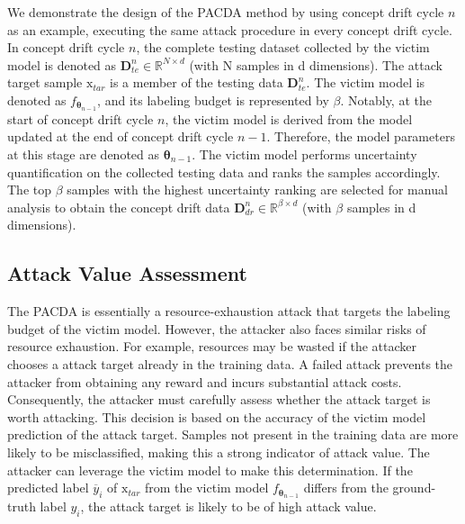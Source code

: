 \documentclass[conference,compsoc]{IEEEtran} %
\begin{document}
We demonstrate the design of the PACDA method by using concept drift cycle $n$ as an example, executing the same attack procedure in every concept drift cycle.
In concept drift cycle $n$, the complete testing dataset collected by the victim model is denoted as $\bm{D}_{te}^{n} \in \mathbb{R}^{N \times d}$ (with N samples in d dimensions).
The attack target sample $\bm{\mathrm{x}}_{tar}$ is a member of the testing data $\bm{D}_{te}^{n}$. 
The victim model is denoted as $f_{\bm{\theta}_{n-1}}$, and its labeling budget is represented by $\beta$.
Notably, at the start of concept drift cycle $n$, the victim model is derived from the model updated at the end of concept drift cycle $n-1$. Therefore, the model parameters at this stage are denoted as $\bm{\theta}_{n-1}$.
The victim model performs uncertainty quantification on the collected testing data and ranks the samples accordingly.
The top $\beta$ samples with the highest uncertainty ranking are selected for manual analysis to obtain the concept drift data $\bm{D}_{dr}^{n} \in \mathbb{R}^{\beta \times d}$ (with $\beta$ samples in d dimensions).

\subsection{Attack Value Assessment}
\label{Sec: Attack Value Assessment}
The PACDA is essentially a resource-exhaustion attack that targets the labeling budget of the victim model.
However, the attacker also faces similar risks of resource exhaustion.
For example, resources may be wasted if the attacker chooses a attack target already in the training data.
A failed attack prevents the attacker from obtaining any reward and incurs substantial attack costs.
Consequently, the attacker must carefully assess whether the attack target is worth attacking.
This decision is based on the accuracy of the victim model  prediction of the attack target.
Samples not present in the training data are more likely to be misclassified, making this a strong indicator of attack value.
The attacker can leverage the victim model to make this determination.
If the predicted label $\overline{y}_{i}$ of $\bm{\mathrm{x}}_{tar}$ from the victim model $f_{\bm{\theta}_{n-1}}$ differs from the ground-truth label $y_{i}$, the attack target is likely to be of high attack value.
\end{document}

